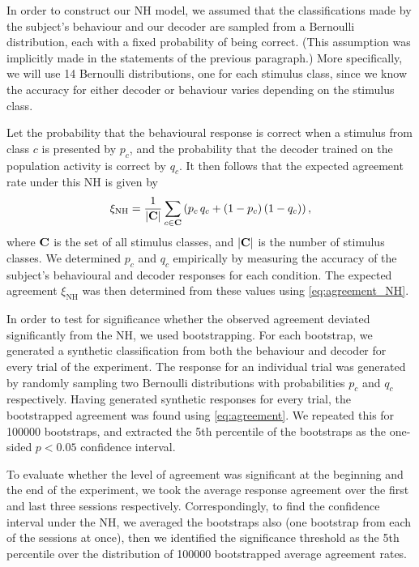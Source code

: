 In order to construct our \ac{NH} model, we assumed that the classifications made by the subject's behaviour and our decoder are sampled from a Bernoulli distribution, each with a fixed probability of being correct.
(This assumption was implicitly made in the statements of the previous paragraph.)
More specifically, we will use \num{14} Bernoulli distributions, one for each stimulus class, since we know the accuracy for either decoder or behaviour varies depending on the stimulus class.

Let the probability that the behavioural response is correct when a stimulus from class $c$ is presented by $p_c$, and the probability that the decoder trained on the population activity is correct by $q_c$.
It then follows that the expected agreement rate under this \acf{NH} is given by
\begin{equation}
\label{eq:agreement_NH}
\xi_\text{NH} = \frac{1}{|\mathbf{C}|} \sum_{c \in \mathbf{C}} \left( p_c \, q_c + (1 - p_c) \, (1 - q_c) \right)
,\end{equation}
where $\mathbf{C}$ is the set of all stimulus classes, and $|\mathbf{C}|$ is the number of stimulus classes.
We determined $p_c$ and $q_c$ empirically by measuring the accuracy of the subject's behavioural and decoder responses for each condition.
The expected agreement $\xi_\text{NH}$ was then determined from these values using \autoref{eq:agreement_NH}.

In order to test for significance whether the observed agreement deviated significantly from the \ac{NH}, we used bootstrapping.
For each bootstrap, we generated a synthetic classification from both the behaviour and decoder for every trial of the experiment.
The response for an individual trial was generated by randomly sampling two Bernoulli distributions with probabilities $p_c$ and $q_c$ respectively.
Having generated synthetic responses for every trial, the bootstrapped agreement was found using \autoref{eq:agreement}.
We repeated this for \num{100000} bootstraps, and extracted the 5th percentile of the bootstraps as the one-sided $p < 0.05$ confidence interval.

To evaluate whether the level of agreement was significant at the beginning and the end of the experiment, we took the average response agreement over the first and last three sessions respectively. 
Correspondingly, to find the confidence interval under the \ac{NH}, we averaged the bootstraps also (one bootstrap from each of the sessions at once), then we identified the significance threshold as the 5th percentile over the distribution of \num{100000} bootstrapped average agreement rates.


